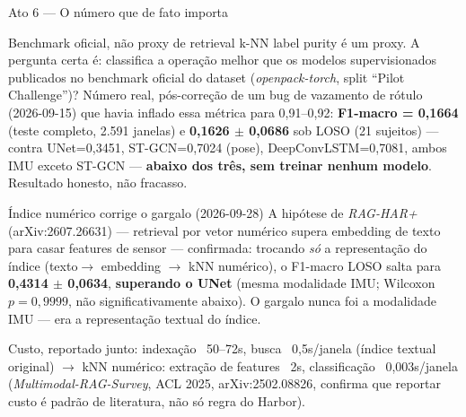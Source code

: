 \documentclass{beamer}
\newenvironment{numerobloco}[1]{\begin{block}{#1}}{\end{block}}
\begin{document}
\begin{frame}{Ato 6 --- O número que de fato importa}
  \small
  \begin{numerobloco}{Benchmark oficial, não proxy de retrieval}
    k-NN label purity é um proxy. A pergunta certa é: classifica a operação
    melhor que os modelos supervisionados publicados no benchmark oficial do
    dataset (\emph{openpack-torch}, split ``Pilot Challenge'')?
    Número real, pós-correção de um bug de vazamento de rótulo (2026-09-15)
    que havia inflado essa métrica para 0,91--0,92: \textbf{F1-macro = 0,1664}
    (teste completo, 2.591 janelas) e \textbf{0,1626 $\pm$ 0,0686} sob LOSO
    (21 sujeitos) --- contra UNet=0,3451, ST-GCN=0,7024 (pose),
    DeepConvLSTM=0,7081, ambos IMU exceto ST-GCN --- \textbf{abaixo dos três,
    sem treinar nenhum modelo}. Resultado honesto, não fracasso.
  \end{numerobloco}

  \pause
  \begin{numerobloco}{Índice numérico corrige o gargalo (2026-09-28)}
    A hipótese de \emph{RAG-HAR+} (arXiv:2607.26631) --- retrieval por vetor
    numérico supera embedding de texto para casar features de sensor ---
    confirmada: trocando \emph{só} a representação do índice (texto$\to$
    embedding $\to$ kNN numérico), o F1-macro LOSO salta para
    \textbf{0,4314 $\pm$ 0,0634}, \textbf{superando o UNet} (mesma modalidade
    IMU; Wilcoxon $p=0{,}9999$, não significativamente abaixo). O gargalo
    nunca foi a modalidade IMU --- era a representação textual do índice.
  \end{numerobloco}

  \pause
  Custo, reportado junto: indexação ~50--72s, busca ~0,5s/janela (índice
  textual original) $\to$ kNN numérico: extração de features ~2s, classificação
  ~0,003s/janela (\emph{Multimodal-RAG-Survey}, ACL 2025, arXiv:2502.08826,
  confirma que reportar custo é padrão de literatura, não só regra do Harbor).
\end{frame}
\end{document}
